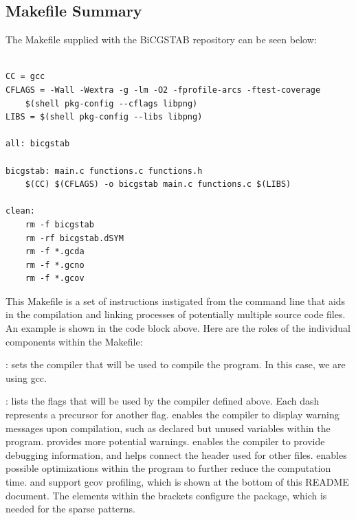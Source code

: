 \documentclass[12pt]{article}
\begin{document}
	\subsection{Makefile Summary}
	
	The Makefile supplied with the BiCGSTAB repository can be seen below:

 	\begin{mdframed}[style=myboxstyleTerminal1]
		\begin{verbatim}
  
CC = gcc
CFLAGS = -Wall -Wextra -g -lm -O2 -fprofile-arcs -ftest-coverage 
    $(shell pkg-config --cflags libpng)
LIBS = $(shell pkg-config --libs libpng)

all: bicgstab

bicgstab: main.c functions.c functions.h
	$(CC) $(CFLAGS) -o bicgstab main.c functions.c $(LIBS)

clean:
	rm -f bicgstab
	rm -rf bicgstab.dSYM
	rm -f *.gcda
	rm -f *.gcno
	rm -f *.gcov
		\end{verbatim}
	\end{mdframed}

This Makefile is a set of instructions instigated from the command line that aids in the compilation and linking processes of potentially multiple source code files. An example is shown in the code block above. Here are the roles of the individual components within the Makefile:

:  sets the compiler that will be used to compile the program. In this case, we are using gcc.

:  lists the flags that will be used by the compiler defined above. Each dash represents a precursor for another flag.  enables the compiler to display warning messages upon compilation, such as declared but unused variables within the program.  provides more potential warnings.  enables the compiler to provide debugging information, and  helps connect the  header used for other files.  enables possible optimizations within the program to further reduce the computation time.  and  support gcov profiling, which is shown at the bottom of this README document. The elements within the brackets configure the  package, which is needed for the sparse patterns.
\end{document}
